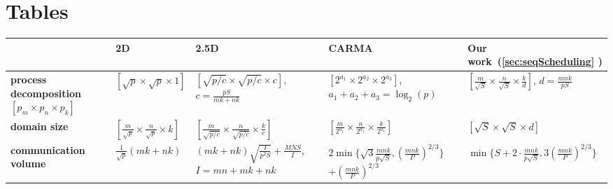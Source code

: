 \documentclass[sigplan,review,anonymous]{acmart}\settopmatter{printfolios=true,printccs=false,printacmref=false}
\begin{document}
\section{Tables}



\begin{table}
	\setlength{\tabcolsep}{4pt}
	\renewcommand{\arraystretch}{2}
	\centering
	\scriptsize
	\sf
	\begin{tabular}{lllll}
		\toprule
		& \textbf{2D~\cite{summa}} & \textbf{2.5D~\cite{25d}} 
		& 
		\textbf{CARMA~\cite{CARMA}} & \textbf{Our 
		work~(\cref{sec:seqScheduling} )} \\
		\midrule
		\makecell[l]{\textbf{process}\\
			\textbf{decomposition} \\
			$\left[p_m \times p_n \times p_k\right]$}
		&
		$\left[\sqrt{p} \times \sqrt{p} \times 1\right]$
		&
		\makecell[l]{$\left[\sqrt{p/c} \times \sqrt{p/c} 
		\times c\right]$,\\
			$c = \frac{pS}{mk + nk}$}
		& 
		\makecell[l]{$\left[{2^{a_1}} \times {2^{a_2}} \times 
		{2^{a_3}}\right]$,\\
			$a_1 + a_2 + a_3 = \log_2(p)$}
		& 
		\makecell[l]{$\left[\frac{m}{\sqrt{S}} \times 
		\frac{n}{\sqrt{S}} \times 
			\frac{k}{d}\right]$,\\
			$d = \frac{mnk}{pS}$}
		\vspace{1.0em}
		\\
		\textbf{domain size}
		&
		$\left[\frac{m}{\sqrt{p}} \times \frac{n}{\sqrt{p}} 
		\times k\right]$ 
		&
		$\left[\frac{m}{\sqrt{p/c}} \times 
		\frac{n}{\sqrt{p/c}} \times 
		\frac{k}{c}\right]$
		&
		$\left[\frac{m}{2^{a_1}} \times \frac{n}{2^{a_1}} 
		\times 
		\frac{k}{2^{a_1}}\right]$
		& 
		$\left[{\sqrt{S}} \times {\sqrt{S}} \times {d}\right]$
		\vspace{0.5em}
		\\
		\midrule
		\makecell[l]{\textbf{communication}\\
			\textbf{volume}}
		&
		$\frac{1}{\sqrt{p}} \left(mk + nk\right)$
		&
		\makecell[l]{$(mk + nk)\sqrt{\frac{I}{p^2S}} + 
		\frac{MNS}{I}$, \\
			$I = mn + mk + nk$}
		&
		\makecell[l]{$2\min \Big\{\sqrt{3} 
		\frac{mnk}{p\sqrt{S}},
			\left(\frac{mnk}{P}\right)^{2/3} \Big\} $ \\
			$ + \left(\frac{mnk}{P}\right)^{2/3}$}
		& 
		$\min \Big\{S + 2 \cdot \frac{mnk}{p\sqrt{S}}, 3 
		\left(\frac{mnk}{P}\right)^{2/3} \Big\}$

\end{tabular}
\end{table}
\end{document}
